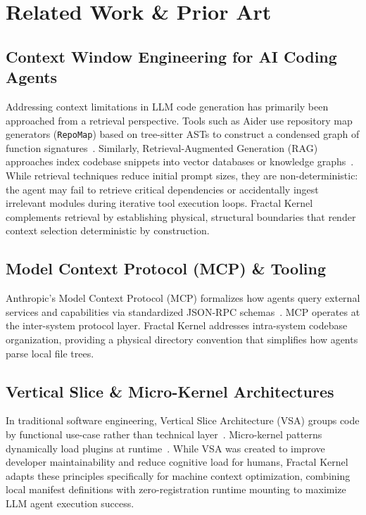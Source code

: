 \documentclass[conference]{IEEEtran}
\begin{document}
\section{Related Work \& Prior Art}

\subsection{Context Window Engineering for AI Coding Agents}
Addressing context limitations in LLM code generation has primarily been approached from a retrieval perspective. Tools such as Aider use repository map generators (\texttt{RepoMap}) based on tree-sitter ASTs to construct a condensed graph of function signatures~\cite{aider2024}. Similarly, Retrieval-Augmented Generation (RAG) approaches index codebase snippets into vector databases or knowledge graphs~\cite{graph_rag2024}. While retrieval techniques reduce initial prompt sizes, they are non-deterministic: the agent may fail to retrieve critical dependencies or accidentally ingest irrelevant modules during iterative tool execution loops. Fractal Kernel complements retrieval by establishing physical, structural boundaries that render context selection deterministic by construction.

\subsection{Model Context Protocol (MCP) \& Tooling}
Anthropic's Model Context Protocol (MCP) formalizes how agents query external services and capabilities via standardized JSON-RPC schemas~\cite{mcp2024}. MCP operates at the inter-system protocol layer. Fractal Kernel addresses intra-system codebase organization, providing a physical directory convention that simplifies how agents parse local file trees.

\subsection{Vertical Slice \& Micro-Kernel Architectures}
In traditional software engineering, Vertical Slice Architecture (VSA) groups code by functional use-case rather than technical layer~\cite{vsa2020}. Micro-kernel patterns dynamically load plugins at runtime~\cite{microkernel2018}. While VSA was created to improve developer maintainability and reduce cognitive load for humans, Fractal Kernel adapts these principles specifically for machine context optimization, combining local manifest definitions with zero-registration runtime mounting to maximize LLM agent execution success.
\end{document}
